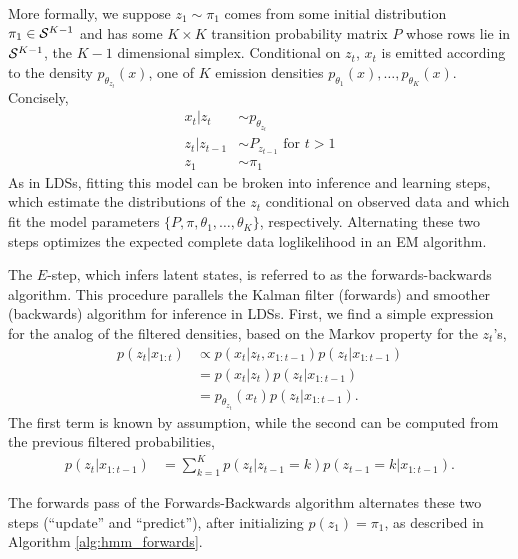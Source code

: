 \documentclass[14pt]{extarticle}
\begin{document}
More formally, we suppose $z_{1} \sim \pi_{1}$ comes from some initial
distribution $\pi_{1} \in \mathcal{S}^{K - 1}$ and has some $K \times K$ transition
probability matrix $P$ whose rows lie in $\mathcal{S}^{K - 1}$, the $K - 1$
dimensional simplex. Conditional on $z_{t}$, $x_{t}$ is emitted according to the
density $p_{\theta_{z_{t}}}\left(x\right)$, one of $K$ emission densities
$p_{\theta_{1}}\left(x\right), \dots, p_{\theta_{K}}\left(x\right)$. Concisely,
\begin{align*}
  x_{t} \vert z_{t} &\sim p_{\theta_{z_{t}}} \\
  z_{t} \vert z_{t - 1} &\sim P_{z_{t - 1}} \text{ for } t > 1 \\
  z_{1} &\sim \pi_{1}
\end{align*}
As in LDSs, fitting this model can be broken into inference and learning steps,
which estimate the distributions of the $z_{t}$ conditional on observed data and
which fit the model parameters $\{P, \pi, \theta_{1}, \dots, \theta_{K}\}$,
respectively. Alternating these two steps optimizes the expected complete data
loglikelihood in an EM algorithm.

The $E$-step, which infers latent states, is referred to as the
forwards-backwards algorithm. This procedure parallels the Kalman filter
(forwards) and smoother (backwards) algorithm for inference in LDSs. First, we
find a simple expression for the analog of the filtered densities, based on the
Markov property for the $z_{t}$'s,
\begin{align*}
  p\left(z_{t} \vert x_{1:t}\right) &\propto p\left(x_{t} \vert z_{t}, x_{1:t - 1}\right) p\left(z_{t} \vert x_{1:t - 1}\right) \\
  &= p\left(x_{t} \vert z_{t}\right) p\left(z_{t} \vert x_{1:t - 1}\right) \\
  &= p_{\theta_{z_{t}}}\left(x_{t}\right)p\left(z_{t} \vert x_{1:t - 1}\right).
\end{align*}
The first term is known by assumption, while the second can be computed from the
previous filtered probabilities,
\begin{align*}
  p\left(z_{t} \vert x_{1:t - 1}\right) &= \sum_{k = 1}^{K} p\left(z_{t} \vert z_{t - 1} = k\right)p\left(z_{t - 1} = k \vert x_{1:t - 1} \right).
\end{align*}

The forwards pass of the Forwards-Backwards algorithm alternates these two steps
(``update'' and ``predict''), after initializing $p\left(z_{1}\right) =
\pi_{1}$, as described in Algorithm \ref{alg:hmm_forwards}.
\end{document}
